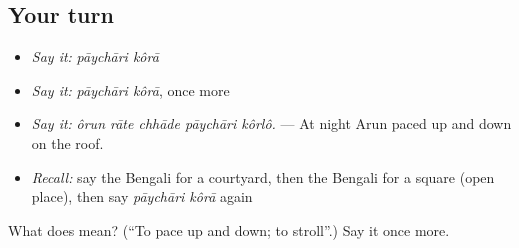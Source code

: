 \subsection*{Your turn}
\begin{itemize}
\raggedright
  \item \emph{Say it:} \emph{pāychāri kôrā}
  \item \emph{Say it:} \emph{pāychāri kôrā}, once more
  \item \emph{Say it:} \emph{ôrun rāte chhāde pāychāri kôrlô.} — At night Arun paced up and down on the roof.
  \item \emph{Recall:} say the Bengali for a courtyard, then the Bengali for a square (open place), then say \emph{pāychāri kôrā} again
\end{itemize}

\begin{tcolorbox}[breakable,colback=teal!4,colframe=teal!35!black,title={Before you move on}]
What does   mean? (\textquotedblleft{}To pace up and down; to stroll\textquotedblright{}.) Say it once more.
\end{tcolorbox}
